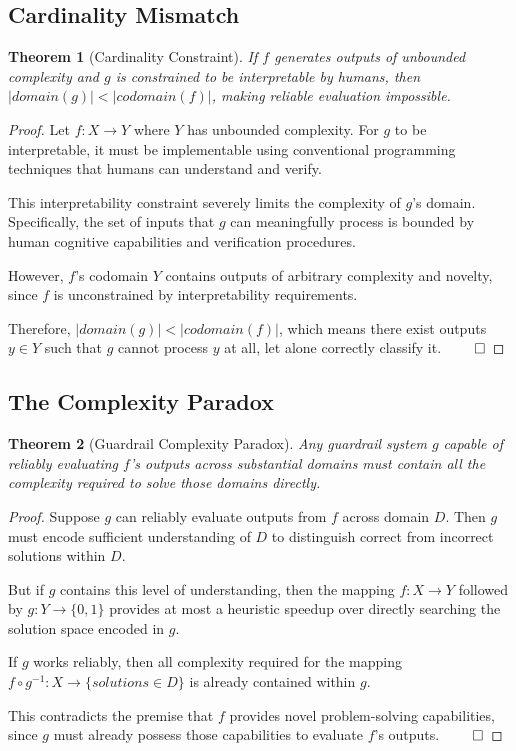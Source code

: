 \documentclass[11pt]{article}
\newtheorem{theorem}{Theorem}
\begin{document}
\subsection{Cardinality Mismatch}

\begin{theorem}[Cardinality Constraint]
If $f$ generates outputs of unbounded complexity and $g$ is constrained to be interpretable by humans, then $|domain(g)| < |codomain(f)|$, making reliable evaluation impossible.
\end{theorem}

\begin{proof}
Let $f: X \rightarrow Y$ where $Y$ has unbounded complexity. For $g$ to be interpretable, it must be implementable using conventional programming techniques that humans can understand and verify.

This interpretability constraint severely limits the complexity of $g$'s domain. Specifically, the set of inputs that $g$ can meaningfully process is bounded by human cognitive capabilities and verification procedures.

However, $f$'s codomain $Y$ contains outputs of arbitrary complexity and novelty, since $f$ is unconstrained by interpretability requirements.

Therefore, $|domain(g)| < |codomain(f)|$, which means there exist outputs $y \in Y$ such that $g$ cannot process $y$ at all, let alone correctly classify it. $\qed$
\end{proof}

\subsection{The Complexity Paradox}

\begin{theorem}[Guardrail Complexity Paradox]
Any guardrail system $g$ capable of reliably evaluating $f$'s outputs across substantial domains must contain all the complexity required to solve those domains directly.
\end{theorem}

\begin{proof}
Suppose $g$ can reliably evaluate outputs from $f$ across domain $D$. Then $g$ must encode sufficient understanding of $D$ to distinguish correct from incorrect solutions within $D$.

But if $g$ contains this level of understanding, then the mapping $f: X \rightarrow Y$ followed by $g: Y \rightarrow \{0,1\}$ provides at most a heuristic speedup over directly searching the solution space encoded in $g$.

If $g$ works reliably, then all complexity required for the mapping $f \circ g^{-1}: X \rightarrow \{solutions \in D\}$ is already contained within $g$.

This contradicts the premise that $f$ provides novel problem-solving capabilities, since $g$ must already possess those capabilities to evaluate $f$'s outputs. $\qed$
\end{proof}
\end{document}
